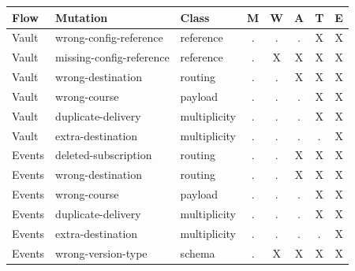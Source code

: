 \begin{tabular}{lllccccc}\toprule
Flow & Mutation & Class & M & W & A & T & E \\\midrule
Vault & wrong-config-reference & reference & . & . & . & X & X \\
Vault & missing-config-reference & reference & . & X & X & X & X \\
Vault & wrong-destination & routing & . & . & X & X & X \\
Vault & wrong-course & payload & . & . & . & X & X \\
Vault & duplicate-delivery & multiplicity & . & . & . & X & X \\
Vault & extra-destination & multiplicity & . & . & . & . & X \\
Events & deleted-subscription & routing & . & . & X & X & X \\
Events & wrong-destination & routing & . & . & X & X & X \\
Events & wrong-course & payload & . & . & . & X & X \\
Events & duplicate-delivery & multiplicity & . & . & . & X & X \\
Events & extra-destination & multiplicity & . & . & . & . & X \\
Events & wrong-version-type & schema & . & X & X & X & X \\
\bottomrule\end{tabular}
